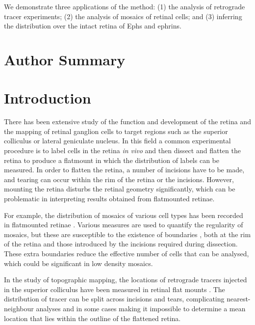 \documentclass[10pt]{article}
\begin{document}
We demonstrate three applications of the method: (1) the analysis of
retrograde tracer experiments; (2) the analysis of mosaics of retinal
cells; and (3) inferring the distribution over the intact retina of
Ephs and ephrins.

\section*{Author Summary}


\section*{Introduction}

There has been extensive study of the function and development of the
retina and the mapping of retinal ganglion cells to target regions
such as the superior colliculus or lateral geniculate nucleus. In this
field a common experimental procedure is to label cells in the retina
\emph{in vivo} and then dissect and flatten the retina to produce a
flatmount in which the distribution of labels can be measured. In
order to flatten the retina, a number of incisions have to be made,
and tearing can occur within the rim of the retina or the incisions.
However, mounting the retina disturbs the retinal geometry
significantly, which can be problematic in interpreting results
obtained from flatmounted retinae.

For example, the distribution of mosaics of various cell types has
been recorded in flatmounted retinae
\cite{WassBoyc91func,RaveEtal03dete}.  Various measures are used to
quantify the regularity of mosaics, but these are susceptible to the
existence of boundaries \cite{Cook96spat}, both at the rim of the
retina and those introduced by the incisions required during
dissection. These extra boundaries reduce the effective number of
cells that can be analysed, which could be significant in low density
mosaics.

In the study of topographic mapping, the locations of retrograde
tracers injected in the superior colliculus have been measured in
retinal flat mounts \cite{RebeEtal04rela,RashEtal05oppo}. The
distribution of tracer can be split across incisions and tears,
complicating nearest-neighbour analyses and in some cases making it
impossible to determine a mean location that lies within the outline
of the flattened retina.
\end{document}
